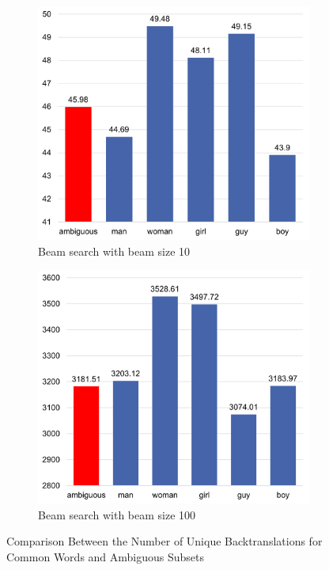 \begin{figure}[!htb]
     \centering
     
     \begin{subfigure}{0.49\textwidth}
         \centering
         \includegraphics[width=\textwidth]{figures/uniqueness/range_beam_10.png}
         \caption{Beam search with beam size 10}
         \label{fig:uniqueness_range_10}
     \end{subfigure}
     \hfill
     \begin{subfigure}{0.49\textwidth}
         \centering
         \includegraphics[width=\textwidth]{figures/uniqueness/range_beam_100.png}
         \caption{Beam search with beam size 100}
         \label{fig:uniqueness_range_100}
     \end{subfigure}
     
    \caption{Comparison Between the Number of Unique Backtranslations for Common Words and Ambiguous Subsets}
    \label{fig:uniqueness_range}

\end{figure}



